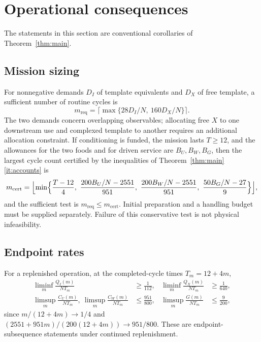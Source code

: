\documentclass[11pt,a4paper]{article}
\theoremstyle{plain}
\theoremstyle{definition}
\theoremstyle{remark}
\newcommand{\Iv}{I}
\begin{document}
\section{Operational consequences}\label{sec:consequences}
The statements in this section are conventional corollaries of Theorem~\ref{thm:main}.

\subsection{Mission sizing}
For nonnegative demands $D_\Iv$ of template equivalents and $D_X$ of free template, a sufficient number of routine cycles is
\begin{equation}\label{eq:demand}
m_{\mathrm{req}}=\bigl\lceil\max\{28D_\Iv/N,\ 160D_X/N\}\bigr\rceil .
\end{equation}
The two demands concern overlapping observables; allocating free $X$ to one downstream use and complexed template to another requires an additional allocation constraint. If conditioning is funded, the mission lasts $T\ge12$, and the allowances for the two foods and for driven service are $B_U,B_W,B_G$, then the largest cycle count certified by the inequalities of Theorem~\ref{thm:main}\ref{it:accounts} is
\begin{equation}\label{eq:budget}
m_{\mathrm{cert}}=\Bigl\lfloor\min\Bigl\{\frac{T-12}4,\ \frac{200B_U/N-2551}{951},\ \frac{200B_W/N-2551}{951},\ \frac{50B_G/N-27}9\Bigr\}\Bigr\rfloor,
\end{equation}
and the sufficient test is $m_{\mathrm{req}}\le m_{\mathrm{cert}}$. Initial preparation and a handling budget must be supplied separately. Failure of this conservative test is not physical infeasibility.

\subsection{Endpoint rates}
For a replenished operation, at the completed-cycle times $T_m=12+4m$,
\begin{equation}\label{eq:rates}
\begin{aligned}
\liminf_{m}\frac{Q_\Iv(m)}{NT_m}&\ge\frac1{112},&
\liminf_{m}\frac{Q_X(m)}{NT_m}&\ge\frac1{640},\\
\limsup_{m}\frac{C_U(m)}{NT_m},\ \limsup_{m}\frac{C_W(m)}{NT_m}&\le\frac{951}{800},&
\limsup_{m}\frac{G(m)}{NT_m}&\le\frac9{200},
\end{aligned}
\end{equation}
since $m/(12+4m)\to1/4$ and $(2551+951m)/(200(12+4m))\to951/800$. These are endpoint-subsequence statements under continued replenishment.
\end{document}
